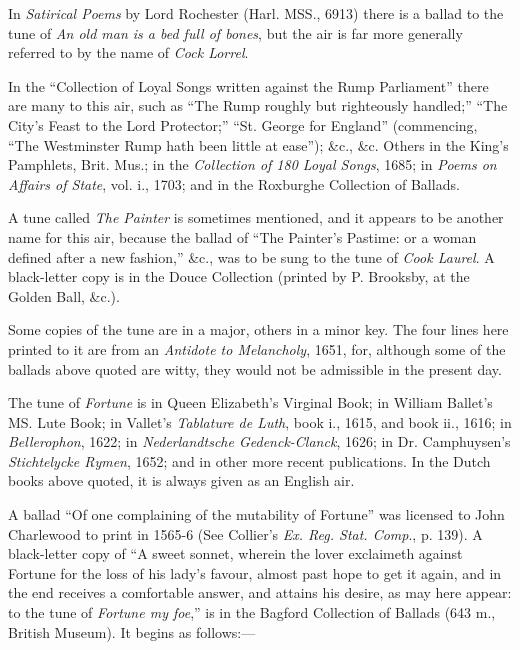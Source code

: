 In \textit{Satirical Poems} by Lord Rochester (Harl. MSS., 6913) there is a ballad to
the tune of \textit{An old man is a bed full of bones}, but the air is far more generally
referred to by the name of \textit{Cock Lorrel}.

In the “Collection of Loyal Songs written against the Rump Parliament”
there are many to this air, such as “The Rump roughly but righteously
handled;” “The City’s Feast to the Lord Protector;” “St. George for England”
(commencing, “The Westminster Rump hath been little at ease”); \&c., \&c.
Others in the King’s Pamphlets, Brit. Mus.; in the \textit{Collection of 180 Loyal
Songs}, 1685; in \textit{Poems on Affairs of State}, vol. i., 1703; and in the Roxburghe
Collection of Ballads.

A tune called \textit{The Painter} is sometimes mentioned, and it appears to be
another name for this air, because the ballad of “The Painter’s Pastime: or a
woman defined after a new fashion,” \&c., was to be sung to the tune of \textit{Cook
Laurel}. A black-letter copy is in the Douce Collection (printed by P. Brooksby,
at the Golden Ball, \&c.).

Some copies of the tune are in a major, others in a minor key. The four lines
here printed to it are from an \textit{Antidote to Melancholy}, 1651, for, although some
of the ballads above quoted are witty, they would not be admissible in the
present day.


\pagebreak


The tune of \textit{Fortune} is in Queen Elizabeth’s Virginal Book; in William
Ballet’s MS. Lute Book; in Vallet’s \textit{Tablature de Luth}, book i., 1615, and
book ii., 1616; in \textit{Bellerophon}, 1622; in \textit{Nederlandtsche Gedenck-Clanck}, 1626; in
Dr. Camphuysen’s \textit{Stichtelycke Rymen}, 1652; and in other more recent publications. 
In the Dutch books above quoted, it is always given as an English air.

A ballad “Of one complaining of the mutability of Fortune” was licensed to
John Charlewood to print in 1565-6 (See Collier’s \textit{Ex. Reg. Stat. Comp}., p. 139).
A black-letter copy of “A sweet sonnet, wherein the lover exclaimeth against
Fortune for the loss of his lady’s favour, almost past hope to get it again, and in
the end receives a comfortable answer, and attains his desire, as may here appear:
to the tune of \textit{Fortune my foe},” is in the Bagford Collection of Ballads (643 m.,
British Museum). It begins as follows:—

